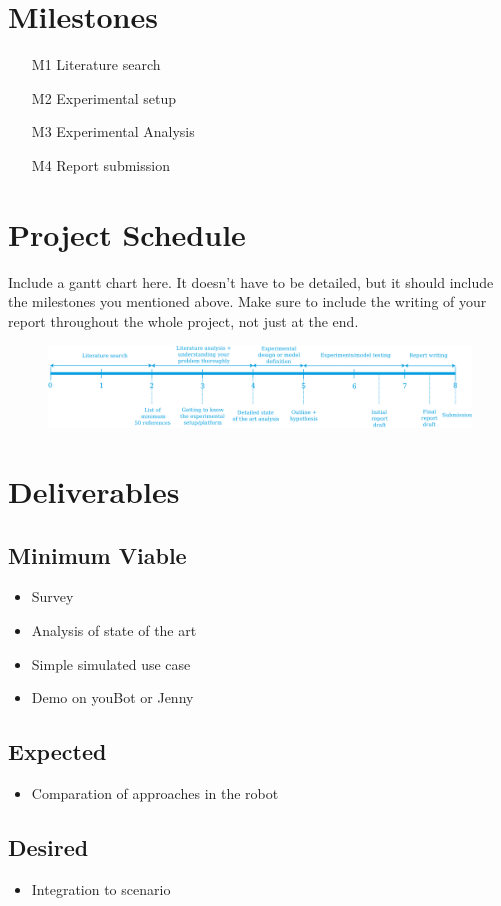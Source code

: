 \documentclass[rnd]{mas_proposal}
\begin{document}
\section{Milestones}
\begin{enumerate}
    \item[M1] Literature search
    \item[M2] Experimental setup
    \item[M3] Experimental Analysis
    \item[M4] Report submission
\end{enumerate}

\section{Project Schedule}
Include a gantt chart here. It doesn't have to be detailed, but it should include the milestones you mentioned above.
Make sure to include the writing of your report throughout the whole project, not just at the end.

\begin{figure}[h!]
    \includegraphics[width=\textwidth]{rnd_deliverable_timeline}
    \caption{}
    \label{}
\end{figure}

\section{Deliverables}
\subsection{Minimum Viable}

\begin{itemize}
    \item Survey
    \item Analysis of state of the art
    \item Simple simulated use case
    \item Demo on youBot or Jenny
\end{itemize}

\subsection{Expected}
\begin{itemize}
    \item Comparation of approaches in the robot
\end{itemize}

\subsection{Desired}
\begin{itemize}
    \item Integration to scenario
\end{itemize}


\nocite{*}

\end{document}
